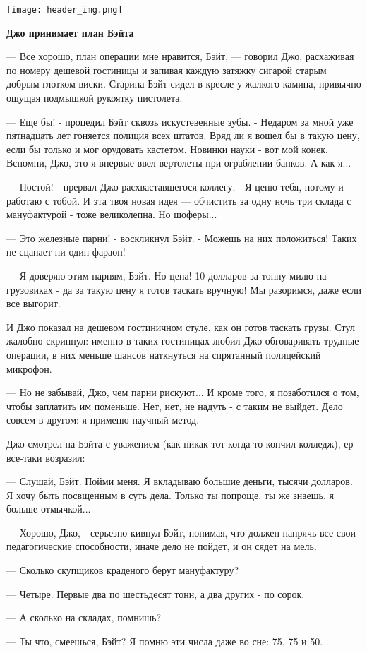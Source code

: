 \documentclass[main.tex]{subfiles}
\begin{document}
\noindent\texttt{[image: header\_img.png]}

\begin{multicols*}{2}

\noindent\textbf{Джо принимает план Бэйта}

\noindent--- Все хорошо, план операции мне нравится, Бэйт, --- говорил Джо, расхаживая по номеру дешевой гостиницы и запивая каждую затяжку сигарой старым добрым глотком виски. Старина Бэйт сидел в кресле у жалкого камина, привычно ощущая подмышкой рукоятку пистолета.

--- Еще бы! - процедил Бэйт сквозь искустевенные зубы. - Недаром за мной уже пятнадцать лет гоняется полиция всех штатов. Вряд ли я вошел бы в такую цену, если бы только и мог орудовать кастетом. Новинки науки - вот мой конек. Вспомни, Джо, это я впервые ввел вертолеты при ограблении банков. А как я...

--- Постой! - прервал Джо расхваставшегося коллегу. - Я ценю тебя, потому и работаю с тобой. И эта твоя новая идея --- обчистить за одну ночь три склада с мануфактурой - тоже великолепна. Но шоферы...

--- Это железные парни! - воскликнул Бэйт. - Можешь на них положиться! Таких не сцапает ни один фараон!

--- Я доверяю этим парням, Бэйт. Но цена! 10 долларов за тонну-милю на грузовиках - да за такую цену я готов таскать вручную! Мы разоримся, даже если все выгорит.

И Джо показал на дешевом гостиничном стуле, как он готов таскать грузы. Стул жалобно скрипнул: именно в таких гостиницах любил Джо обговаривать трудные операции, в них меньше шансов наткнуться на спрятанный полицейский микрофон.

--- Но не забывай, Джо, чем парни рискуют... И кроме того, я позаботился о том, чтобы заплатить им поменьше. Нет, нет, не надуть - с таким не выйдет. Дело совсем в другом: я применю научный метод.

Джо смотрел на Бэйта с уважением (как-никак тот когда-то кончил колледж), ер все-таки возразил:

--- Слушай, Бэйт. Пойми меня. Я вкладываю большие деньги, тысячи долларов. Я хочу быть посвщенным в суть дела. Только ты попроще, ты же знаешь, я больше отмычкой...

--- Хорошо, Джо, - серьезно кивнул Бэйт, понимая, что должен напрячь все свои педагогические способности, иначе дело не пойдет, и он сядет на мель.

--- Сколько скупщиков краденого берут мануфактуру?

--- Четыре. Первые два по шестьдесят тонн, а два других - по сорок.

--- А сколько на складах, помнишь?

--- Ты что, смеешься, Бэйт? Я помню эти числа даже во сне: 75, 75 и 50.

\end{multicols*}
\newpage
\end{document}
